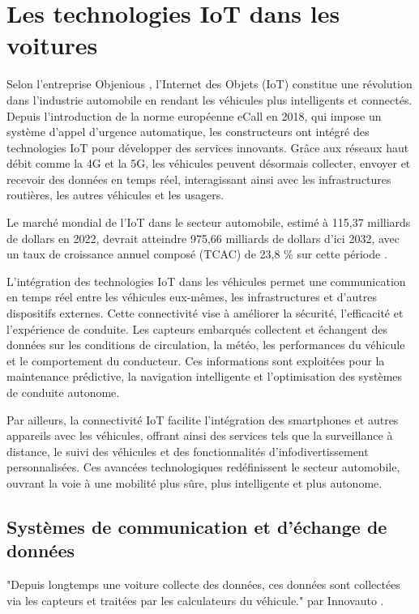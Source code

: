 \documentclass{article}
\begin{document}
\newpage
\section{Les technologies IoT dans les voitures}

Selon l’entreprise Objenious \cite{noauthor_revolution_2025}, l’Internet des Objets (IoT) constitue une révolution dans l’industrie automobile en rendant les véhicules plus intelligents et connectés. Depuis l’introduction de la norme européenne eCall en 2018, qui impose un système d’appel d’urgence automatique, les constructeurs ont intégré des technologies IoT pour développer des services innovants. Grâce aux réseaux haut débit comme la 4G et la 5G, les véhicules peuvent désormais collecter, envoyer et recevoir des données en temps réel, interagissant ainsi avec les infrastructures routières, les autres véhicules et les usagers.

Le marché mondial de l’IoT dans le secteur automobile, estimé à 115,37 milliards de dollars en 2022, devrait atteindre 975,66 milliards de dollars d’ici 2032, avec un taux de croissance annuel composé (TCAC) de 23,8 \% sur cette période \cite{noauthor_taille_2023}.

L’intégration des technologies IoT dans les véhicules permet une communication en temps réel entre les véhicules eux-mêmes, les infrastructures et d’autres dispositifs externes. Cette connectivité vise à améliorer la sécurité, l’efficacité et l’expérience de conduite. Les capteurs embarqués collectent et échangent des données sur les conditions de circulation, la météo, les performances du véhicule et le comportement du conducteur. Ces informations sont exploitées pour la maintenance prédictive, la navigation intelligente et l’optimisation des systèmes de conduite autonome.

Par ailleurs, la connectivité IoT facilite l’intégration des smartphones et autres appareils avec les véhicules, offrant ainsi des services tels que la surveillance à distance, le suivi des véhicules et des fonctionnalités d’infodivertissement personnalisées. Ces avancées technologiques redéfinissent le secteur automobile, ouvrant la voie à une mobilité plus sûre, plus intelligente et plus autonome.


\subsection{Systèmes de communication et d’échange de données}
"Depuis longtemps une voiture collecte des données, ces données sont collectées via les capteurs et traitées par les calculateurs du véhicule." par Innovauto \cite{donnees_echange}.
\end{document}
